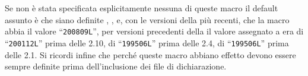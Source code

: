 Se non è stata specificata esplicitamente nessuna di queste macro il default
assunto è che siano definite , ,
 e, con le versioni della  più recenti, che
la macro  abbia il valore ``\texttt{200809L}'', per
versioni precedenti della  il valore assegnato a
 era di ``\texttt{200112L}'' prima delle 2.10, di
``\texttt{199506L}'' prima delle 2.4, di ``\texttt{199506L}'' prima delle
2.1. Si ricordi infine che perché queste macro abbiano effetto devono essere
sempre definite prima dell'inclusione dei file di dichiarazione.






